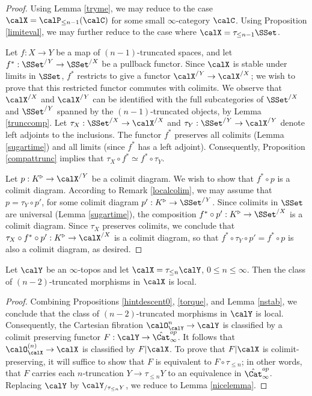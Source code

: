 \begin{proof}
Using Lemma \ref{tryme}, we may reduce to the case $\calX = \calP_{\leq n-1}(\calC)$ for some small $\infty$-category $\calC$. Using Proposition \ref{limiteval}, we may further reduce to the case where $\calX = \tau_{\leq n-1} \SSet$. 

Let $f: X \rightarrow Y$ be a map of $(n-1)$-truncated spaces, and let $f^{\ast}: \SSet^{/Y} \rightarrow \SSet^{/X}$ be a pullback functor.
Since $\calX$ is stable under limits in $\SSet$, $f^{\ast}$ restricts to give a functor $\calX^{/Y} \rightarrow \calX^{/X}$; we wish to prove that this restricted functor commutes with colimits. 
We observe
that $\calX^{/X}$ and $\calX^{/Y}$ can be identified with the full subcategories of
$\SSet^{/X}$ and $\SSet^{/Y}$ spanned by the $(n-1)$-truncated objects, by Lemma \ref{trunccomp}. Let $\tau_{X}: \SSet^{/X} \rightarrow \calX^{/X}$ and $\tau_{Y}: \SSet^{/Y} \rightarrow \calX^{/Y}$ denote left adjoints to the inclusions. The functor $f^{\ast}$ preserves all colimits (Lemma \ref{sugartime}) and all limits (since
$f^{\ast}$ has a left adjoint). Consequently, Proposition \ref{compattrunc} implies that
$\tau_{X} \circ f^{\ast} \simeq f^{\ast} \circ \tau_{Y}$.

Let $p: K^{\triangleright} \rightarrow \calX^{/Y}$ be a colimit diagram. We wish to show that
$f^{\ast} \circ p$ is a colimit diagram. According to Remark \ref{localcolim}, we may assume that $p = \tau_{Y} \circ p'$, for some colimit diagram $p': K^{\triangleright} \rightarrow \SSet^{/Y}$. Since colimits in $\SSet$ are universal (Lemma \ref{sugartime}), the composition
$f^{\ast} \circ p': K^{\triangleright} \rightarrow \SSet^{/X}$ is a colimit diagram. Since $\tau_{X}$ preserves colimits, we conclude that $\tau_{X} \circ f^{\ast} \circ p': K^{\triangleright} \rightarrow \calX^{/X}$ is a colimit diagram, so that $f^{\ast} \circ \tau_{Y} \circ p' = f^{\ast} \circ p$ is also a colimit diagram, as desired.
\end{proof}

\begin{proposition}\label{tigress}
Let $\calY$ be an $\infty$-topos and let $\calX = \tau_{\leq n} \calY$, $0 \leq n \leq \infty$. Then the class of $(n-2)$-truncated morphisms in $\calX$ is local.
\end{proposition}

\begin{proof}
Combining Propositions \ref{hintdescent0}, \ref{torque}, and Lemma \ref{nstab}, we conclude
that the class of $(n-2)$-truncated morphisms in $\calY$ is local. Consequently, the Cartesian fibration
$\calO_{\calY}^{n} \rightarrow \calY$ is classified by a colimit preserving functor
$ F: \calY \rightarrow \hat{\Cat}_{\infty}^{op}$. It follows that $\calO_{\calX}^{(n)} \rightarrow \calX$
is classified by $F | \calX$. To prove that $F | \calX$ is colimit-preserving, it will suffice to show that 
$F$ is equivalent to $F \circ \tau_{\leq n}$; in other words, that $F$ carries
each $n$-truncation $Y \rightarrow \tau_{\leq n} Y$ to an equivalence in $\hat{\Cat}_{\infty}^{op}$.
Replacing $\calY$ by $\calY_{/ \tau_{\leq n} Y}$, we reduce to Lemma \ref{nicelemma}.
\end{proof}

